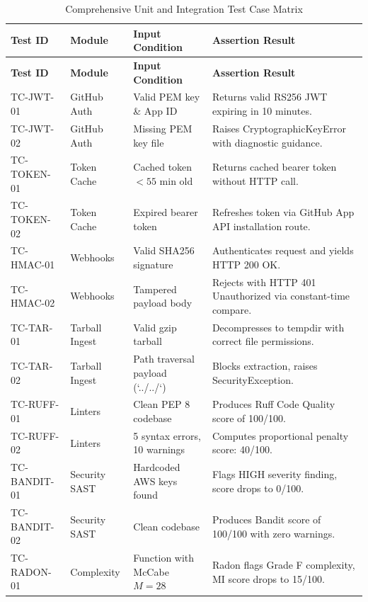 \documentclass[12pt,a4paper,oneside]{report}
\begin{document}
\begin{longtable}{p{} p{} p{} p{}}
\caption{Comprehensive Unit and Integration Test Case Matrix} \label{tab:app-test-cases} \\
\toprule
\textbf{Test ID} & \textbf{Module} & \textbf{Input Condition} & \textbf{Assertion Result} \\
\midrule
\endfirsthead
\toprule
\textbf{Test ID} & \textbf{Module} & \textbf{Input Condition} & \textbf{Assertion Result} \\
\midrule
\endhead
\bottomrule
\endfoot
\bottomrule
\endlastfoot

TC-JWT-01 & GitHub Auth & Valid PEM key \& App ID & Returns valid RS256 JWT expiring in 10 minutes. \\
\addlinespace
TC-JWT-02 & GitHub Auth & Missing PEM key file & Raises CryptographicKeyError with diagnostic guidance. \\
\addlinespace
TC-TOKEN-01 & Token Cache & Cached token $<55$ min old & Returns cached bearer token without HTTP call. \\
\addlinespace
TC-TOKEN-02 & Token Cache & Expired bearer token & Refreshes token via GitHub App API installation route. \\
\addlinespace
TC-HMAC-01 & Webhooks & Valid SHA256 signature & Authenticates request and yields HTTP 200 OK. \\
\addlinespace
TC-HMAC-02 & Webhooks & Tampered payload body & Rejects with HTTP 401 Unauthorized via constant-time compare. \\
\addlinespace
TC-TAR-01 & Tarball Ingest & Valid gzip tarball & Decompresses to tempdir with correct file permissions. \\
\addlinespace
TC-TAR-02 & Tarball Ingest & Path traversal payload (`../../`) & Blocks extraction, raises SecurityException. \\
\addlinespace
TC-RUFF-01 & Linters & Clean PEP 8 codebase & Produces Ruff Code Quality score of 100/100. \\
\addlinespace
TC-RUFF-02 & Linters & 5 syntax errors, 10 warnings & Computes proportional penalty score: 40/100. \\
\addlinespace
TC-BANDIT-01 & Security SAST & Hardcoded AWS keys found & Flags HIGH severity finding, score drops to 0/100. \\
\addlinespace
TC-BANDIT-02 & Security SAST & Clean codebase & Produces Bandit score of 100/100 with zero warnings. \\
\addlinespace
TC-RADON-01 & Complexity & Function with McCabe $M=28$ & Radon flags Grade F complexity, MI score drops to 15/100. \\

\end{longtable}
\end{document}
